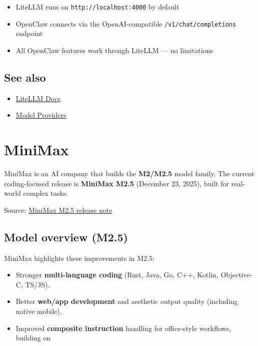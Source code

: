 \begin{itemize}
  \item LiteLLM runs on \texttt{http://localhost:4000} by default
  \item OpenClaw connects via the OpenAI-compatible \texttt{/v1/chat/completions} endpoint
  \item All OpenClaw features work through LiteLLM — no limitations
\end{itemize}


\subsection{See also}


\begin{itemize}
  \item \href{https://docs.litellm.ai}{LiteLLM Docs}
  \item \href{/concepts/model-providers}{Model Providers}
\end{itemize}



\clearpage

\section{MiniMax}


MiniMax is an AI company that builds the \textbf{M2/M2.5} model family. The current
coding-focused release is \textbf{MiniMax M2.5} (December 23, 2025), built for
real-world complex tasks.

Source: \href{https://www.minimax.io/news/minimax-m25}{MiniMax M2.5 release note}

\subsection{Model overview (M2.5)}


MiniMax highlights these improvements in M2.5:

\begin{itemize}
  \item Stronger \textbf{multi-language coding} (Rust, Java, Go, C++, Kotlin, Objective-C, TS/JS).
  \item Better \textbf{web/app development} and aesthetic output quality (including native mobile).
  \item Improved \textbf{composite instruction} handling for office-style workflows, building on
\end{itemize}

